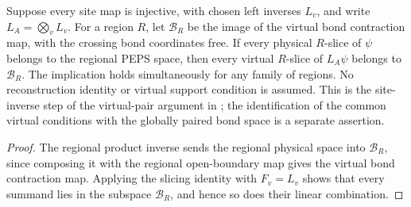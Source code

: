 \begin{lemma}%
    \label{thm:peps_vertex_inverse_region_slice}
    \leanok
    Suppose every site map is injective, with chosen left inverses
    $L_v$, and write $L_A=\bigotimes_vL_v$.
    For a region $R$, let $\mathcal B_R$ be the image of the
    virtual bond contraction map, with the crossing bond coordinates
    free. If every physical $R$-slice of $\psi$ belongs to the
    regional PEPS space, then every virtual $R$-slice of $L_A\psi$
    belongs to $\mathcal B_R$.
    The implication holds simultaneously for any family of regions.
    No reconstruction identity or virtual support condition is assumed.
    This is the site-inverse step of the virtual-pair argument in
    \cite[Section~IV.C.1]{Cirac2021Matrix}; the identification of the
    common virtual conditions with the globally paired bond space
    is a separate assertion.
\end{lemma}

\begin{proof}\leanok
    The regional product inverse sends the regional physical space
    into $\mathcal B_R$, since composing it with the regional
    open-boundary map gives the virtual bond contraction map.
    Applying the slicing identity with $F_v=L_v$ shows that
    every summand lies in the subspace $\mathcal B_R$, and hence so
    does their linear combination.
\end{proof}

